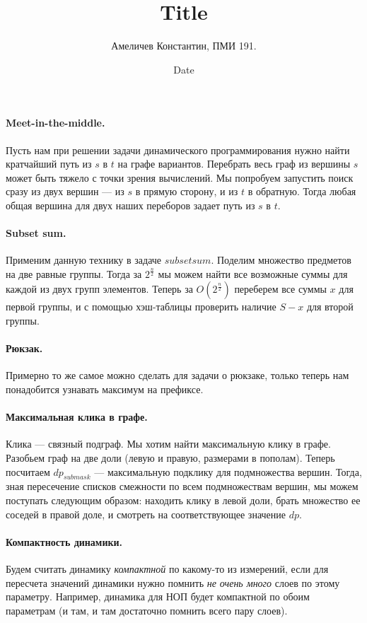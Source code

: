 \documentclass[12pt]{article}
\title{Title}
\author{Амеличев Константин, ПМИ 191.}
\date{Date}
\begin{document}
\paragraph{Meet-in-the-middle.} Пусть нам при решении задачи динамического программирования нужно найти кратчайший путь из $s$ в $t$ на графе вариантов. Перебрать весь граф из вершины $s$ может быть тяжело с точки зрения вычислений. Мы попробуем запустить поиск сразу из двух вершин --- из $s$ в прямую сторону, и из $t$ в обратную. Тогда любая общая вершина для двух наших переборов задает путь из $s$ в $t$.

\paragraph{Subset sum.} Применим данную технику в задаче $subset sum$. Поделим множество предметов на две равные группы. Тогда за $2^{\frac{n}{2}}$ мы можем найти все возможные суммы для каждой из двух групп элементов. Теперь за $O(2^{\frac{n}{2}})$ переберем все суммы $x$ для первой группы, и с помощью хэш-таблицы проверить наличие $S - x$ для второй группы.

\paragraph{Рюкзак.} Примерно то же самое можно сделать для задачи о рюкзаке, только теперь нам понадобится узнавать максимум на префиксе.

\paragraph{Максимальная клика в графе.} Клика --- связный подграф. Мы хотим найти максимальную клику в графе. Разобьем граф на две доли (левую и правую, размерами в пополам). Теперь посчитаем $dp_{submask}$ --- максимальную подклику для подмножества вершин. Тогда, зная пересечение списков смежности по всем подмножествам вершин, мы можем поступать следующим образом: находить клику в левой доли, брать множество ее соседей в правой доле, и смотреть на соответствующее значение $dp$.

\paragraph{Компактность динамики.} Будем считать динамику \textit{компактной} по какому-то из измерений, если для пересчета значений динамики нужно помнить \textit{не очень много} слоев по этому параметру. Например, динамика для НОП будет компактной по обоим параметрам (и там, и там достаточно помнить всего пару слоев).
\end{document}
